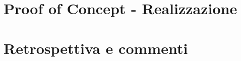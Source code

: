 \documentclass[12pt,a4paper,openright,oneside]{report}
\begin{document}
\clearpage{\pagestyle{empty}\cleardoublepage}
\chapter{Proof of Concept - Realizzazione}           %
\lhead[\fancyplain{}{\bfseries\thepage}]{\fancyplain{}{\bfseries\rightmark}}  


\clearpage{\pagestyle{empty}\cleardoublepage}
\chapter{Retrospettiva e commenti}           %
\lhead[\fancyplain{}{\bfseries\thepage}]{\fancyplain{}{\bfseries\rightmark}}  
\end{document}
